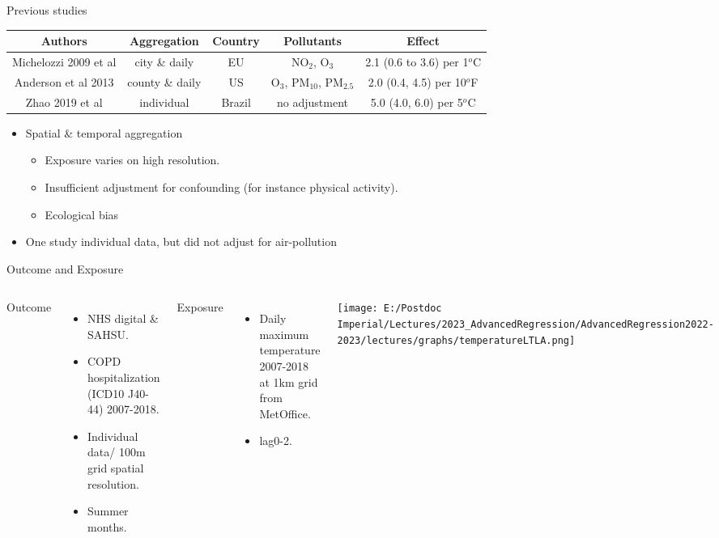 \documentclass{beamer}
\begin{document}
\begin{frame}{Previous studies}
	
	\vspace{-0.5cm}
	\begin{table}[]
		\begin{adjustbox}{width=\columnwidth,center}
			\begin{tabular}{ccccc}
				\hline
				\hline
				\textbf{Authors} & \textbf{Aggregation} & \textbf{Country} & \textbf{Pollutants} & \textbf{Effect}\\ \hline
				\hline
				Michelozzi 2009 et al & city \& daily & EU & $\text{NO}_{2}$, $\text{O}_{3}$ & 2.1 (0.6 to 3.6) per 1$^o$C \\
				Anderson et al 2013 & county \& daily & US & $\text{O}_{3}$, $\text{PM}_{10}$, $\text{PM}_{2.5}$ & 2.0 (0.4, 4.5) per 10$^o$F \\
				Zhao 2019 et al  & individual & Brazil & no adjustment & 5.0 (4.0, 6.0) per 5$^o$C \\
				\hline
				\hline
			\end{tabular}
		\end{adjustbox}
	\end{table}
	\begin{itemize}
		\item Spatial \& temporal aggregation
		\begin{itemize}
			\item Exposure varies on high resolution.
			\item Insufficient adjustment for confounding (for instance physical activity).
			\item Ecological bias
		\end{itemize}
		\item One study individual data, but did not adjust for air-pollution
	\end{itemize}
\end{frame}



\begin{frame}{Outcome and Exposure}
	\begin{columns}
		Outcome
		\begin{itemize}
			\item NHS digital \& SAHSU. 
			\item COPD hospitalization (ICD10 J40-44) 2007-2018.
			\item Individual data/ 100m grid spatial resolution.
			\item Summer months.
		\end{itemize}
		Exposure
		\begin{itemize}
			\item Daily maximum temperature 2007-2018 at 1km grid from MetOffice.
			\item lag0-2.
		\end{itemize}
		\texttt{[image: E:/Postdoc Imperial/Lectures/2023\_AdvancedRegression/AdvancedRegression2022-2023/lectures/graphs/temperatureLTLA.png]}
	\end{columns}
\end{frame}
\end{document}
